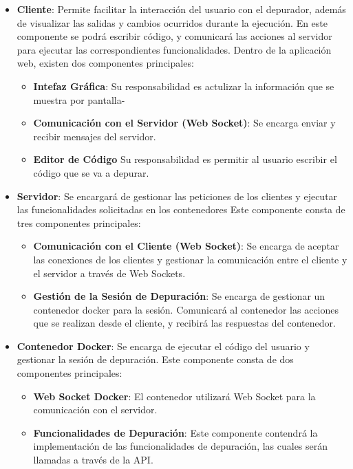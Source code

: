\begin{itemize}
    \item \textbf{Cliente}: Permite facilitar la interacción del usuario con el depurador, además de visualizar las salidas y cambios ocurridos durante la ejecución. En este componente se podrá escribir código, y comunicará las acciones al servidor para ejecutar las correspondientes funcionalidades. 
    Dentro de la aplicación web, existen dos componentes principales:

    \begin{itemize}
        \item \textbf{Intefaz Gráfica}: Su responsabilidad es actulizar la información que se muestra por pantalla-
        \item \textbf{Comunicación con el Servidor (Web Socket)}: Se encarga enviar y recibir mensajes del servidor.
        \item \textbf{Editor de Código} Su responsabilidad es permitir al usuario escribir el código que se va a depurar.
    \end{itemize}

    \item \textbf{Servidor}: Se encargará de gestionar las peticiones de los clientes y ejecutar las funcionalidades solicitadas en los contenedores
    Este componente consta de tres componentes principales:
    \begin{itemize}
        \item \textbf{Comunicación con el Cliente (Web Socket)}: Se encarga de aceptar las conexiones de los clientes y gestionar la comunicación entre el cliente y el servidor a través de Web Sockets.
        \item \textbf{Gestión de la Sesión de Depuración}: Se encarga de gestionar un contenedor docker para la sesión. Comunicará al contenedor las acciones que se realizan desde el cliente, y recibirá las respuestas del contenedor. 
    \end{itemize}

    \item \textbf{Contenedor Docker}: Se encarga de ejecutar el código del usuario y gestionar la sesión de depuración. Este componente consta de dos componentes principales:
    \begin{itemize}
        \item \textbf{Web Socket Docker}: El contenedor utilizará Web Socket para la comunicación con el servidor.
        \item \textbf{Funcionalidades de Depuración}: Este componente contendrá la implementación de las funcionalidades de depuración, las cuales serán llamadas a través de la API.
    \end{itemize}
\end{itemize}

